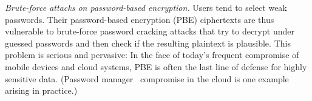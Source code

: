 {%

\begin{newitemize}

\item{\em Brute-force attacks on password-based encryption.}
  Users tend to select weak passwords. Their password-based encryption (PBE)
  ciphertexts are thus vulnerable to brute-force password cracking attacks
  that try to decrypt under guessed passwords and then check if the resulting
  plaintext is plausible.  This problem is serious and pervasive: In the face
  of today's frequent compromise of mobile devices and cloud systems, PBE is
  often the last line of defense for highly sensitive data.  (Password
    manager~\cite{whitney11} compromise in the cloud is one example arising in
    practice.)
%





\end{newitemize}}
